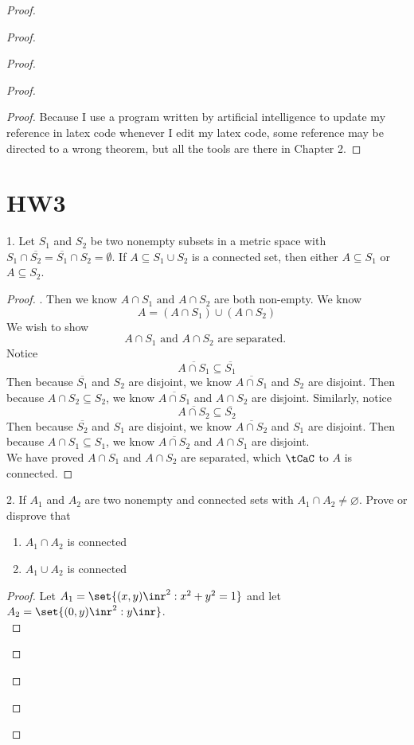 \documentclass{report}
\begin{document}
\begin{proof}
\begin{proof}
\begin{proof}
\begin{proof}
\begin{proof}
Because I use a program written by artificial intelligence to update my reference in latex code whenever I edit my latex code, some reference may be directed to a wrong theorem, but all the tools are there in Chapter 2. 
\end{proof}
\section{HW3}
\begin{question}{}{}
1. Let $S_1$ and $S_2$ be two nonempty subsets in a metric space with $S_1 \cap \overline{S_2} = \overline{S_1}\cap S_2 = \emptyset$. If $A \subseteq S_1 \cup S_2$ is a connected set, then either $A \subseteq S_1$ or $A \subseteq S_2$.
\end{question}
\begin{proof}
. Then we know $A\cap S_1\text{ and }A\cap S_2$ are both non-empty. We know
\begin{equation*}
A=(A\cap S_1)\cup (A\cap S_2)
\end{equation*}
We wish to show
 \begin{equation*}
A\cap S_1\text{ and }A\cap S_2\text{ are separated. }
\end{equation*}
Notice 
\begin{equation*}
\overline{A\cap S_1}\subseteq \overline{S_1}
\end{equation*}
Then because $\overline{S_1}$ and $S_2$ are disjoint, we know $\overline{A\cap S_1}$ and $S_2$ are disjoint. Then because $A\cap S_2\subseteq S_2$, we know $\overline{A\cap S_1}$ and $A\cap S_2$ are disjoint. Similarly, notice
\begin{equation*}
\overline{A\cap S_2}\subseteq \overline{S_2}
\end{equation*}
Then because $\overline{S_2}$ and $S_1$ are disjoint, we know $\overline{A\cap S_2}$ and $S_1$ are disjoint. Then because $A\cap S_1\subseteq S_1$, we know $\overline{A\cap S_2}$ and $A\cap S_1$ are disjoint.    \\

We have proved $A\cap S_1$ and $A\cap S_2$ are separated, which $\tCaC$ to $A$ is connected.
\end{proof}
\begin{question}{}{}
2. If $A_1$ and $A_2$ are two nonempty and connected sets with $A_1\cap A_2\neq \varnothing$. Prove or disprove that
\begin{enumerate}[label=(\alph*)]
  \item $A_1\cap A_2$ is connected
  \item $A_1\cup A_2$ is connected
\end{enumerate}
\end{question}
\begin{proof}
Let $A_1=\set{(x,y)\inr^2:x^2+y^2=1}$ and let  $A_2=\set{(0,y)\inr^2:y\inr}$.\\


\end{proof}
\end{proof}
\end{proof}
\end{proof}
\end{proof}
\end{document}
